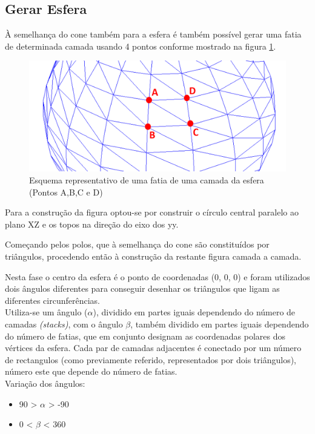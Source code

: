 \newpage
\subsection{Gerar Esfera}

À semelhança do cone também para a esfera é também possível gerar uma fatia de determinada camada usando 4 pontos conforme mostrado na figura \ref{p1:fig:p3_esferaSeccao_edit}.

\begin{figure}[<+htpb+>]
	\centering
	\includegraphics[scale=0.5]{imagens/p3_esferaSeccao_edit.png}
	\caption{Esquema representativo de uma fatia de uma camada da esfera (Pontos A,B,C e D)}
	\label{p1:fig:p3_esferaSeccao_edit}
\end{figure}



Para a construção da figura optou-se por construir o círculo central paralelo ao plano XZ e os topos na direção do eixo dos yy. 

Começando pelos polos, que à semelhança do cone são constituídos por triângulos, procedendo então à construção da restante figura camada a camada. 


Nesta fase o centro da esfera é o ponto de coordenadas (0, 0, 0) e foram utilizados dois ângulos diferentes para conseguir desenhar os triângulos que ligam as diferentes circunferências.\\


Utiliza-se um ângulo ($\alpha$), dividido em partes iguais dependendo do
número de camadas \textit{(stacks)}, com o ângulo  $\beta$, também dividido em partes iguais dependendo do número de fatias, que em conjunto designam as coordenadas polares dos vértices da esfera. Cada par de camadas adjacentes é conectado por um número de rectangulos (como previamente referido, representados por dois triângulos), número este que depende do número de fatias.\\

Variação dos ângulos: 
\begin{itemize}
	\item 90 > $\alpha$ > -90
	\item 0 < $\beta$ < 360 
\end{itemize}

